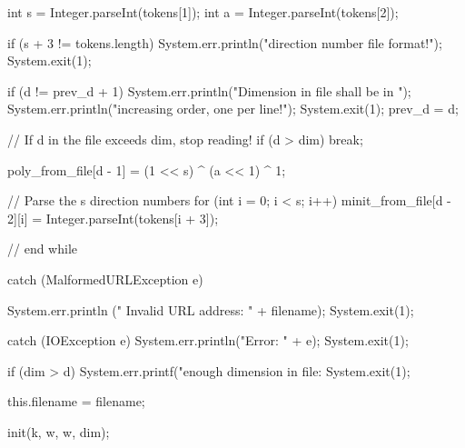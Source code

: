 \begin{code}
\begin{hide}
{{{            int s = Integer.parseInt(tokens[1]);
            int a = Integer.parseInt(tokens[2]);

            if (s + 3 != tokens.length) {
               System.err.println("\nBad direction number file format!\n");
               System.exit(1);
            }

            if (d != prev_d + 1) {
               System.err.println("Dimension in file shall be in ");
               System.err.println("increasing order, one per line!");
               System.exit(1);
            }
            prev_d = d;

            // If d in the file exceeds dim, stop reading!
            if (d > dim)
               break;

            poly_from_file[d - 1] = (1 << s) ^ (a << 1) ^ 1;

            // Parse the s direction numbers
            for (int i = 0; i < s; i++)
               minit_from_file[d - 2][i] = Integer.parseInt(tokens[i + 3]);
         } // end while

      } catch (MalformedURLException e) {
         System.err.println ("   Invalid URL address:   " + filename);
         System.exit(1);

      } catch (IOException e) {
         System.err.println("Error: " + e);
         System.exit(1);
      }

      if (dim > d) {
         System.err.printf("\n\nNot enough dimension in file: %
         System.exit(1);
      }

      this.filename = filename;

      init(k, w, w, dim);
   }\end{hide}
\end{code}
